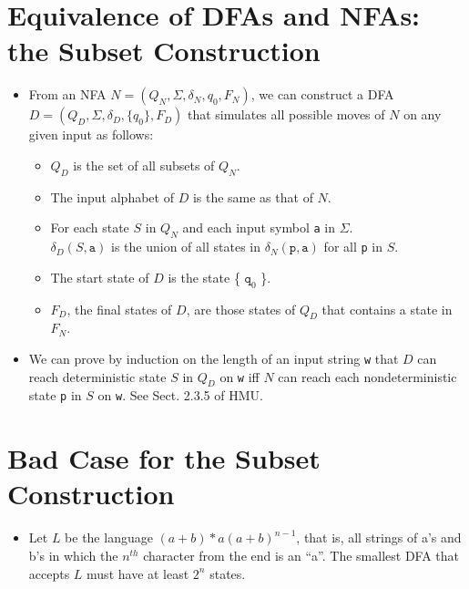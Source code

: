 \documentclass[]{article}
\begin{document}
\section{Equivalence of DFAs and NFAs: the Subset Construction}
  \begin{itemize}
    \item From an NFA $N = (Q_N, \Sigma, \delta_N, q_0, F_N)$, we can
    construct a DFA $D = (Q_D, \Sigma, \delta_D, \{q_0\}, F_D)$ that simulates
    all possible moves of $N$ on any given input as follows:
      \begin{itemize}
        \item $Q_D$ is the set of all subsets of $Q_N$.
        \item The input alphabet of $D$ is the same as that of $N$.
        \item For each state $S$ in $Q_N$ and each input symbol \texttt{a} in
        $\Sigma$. \\
        $\delta_D(S, \texttt{a})$ is the union of all states in $\delta_N(
        \texttt{p}, \texttt{a})$ for all \texttt{p} in $S$.
        \item The start state of $D$ is the state \{ $\texttt{q}_0$ \}.
        \item $F_D$, the final states of $D$, are those states of $Q_D$ that
        contains a state in $F_N$.
      \end{itemize}
    \item We can prove by induction on the length of an input string
    \texttt{w}
    that $D$ can reach deterministic state $S$ in $Q_D$ on \texttt{w} iff $N$
    can reach each nondeterministic state \texttt{p} in $S$ on \texttt{w}. See
    Sect. 2.3.5 of HMU.
  \end{itemize}

\section{Bad Case for the Subset Construction}
  \begin{itemize}
    \item Let $L$ be the language $(a + b)*a(a+b)^{n-1}$, that is, all strings
    of a's and b's in which the $n^{th}$ character from the end is an ``a''.
    The smallest DFA that accepts $L$ must have at least $2^n$ states.
  \end{itemize}
\end{document}
